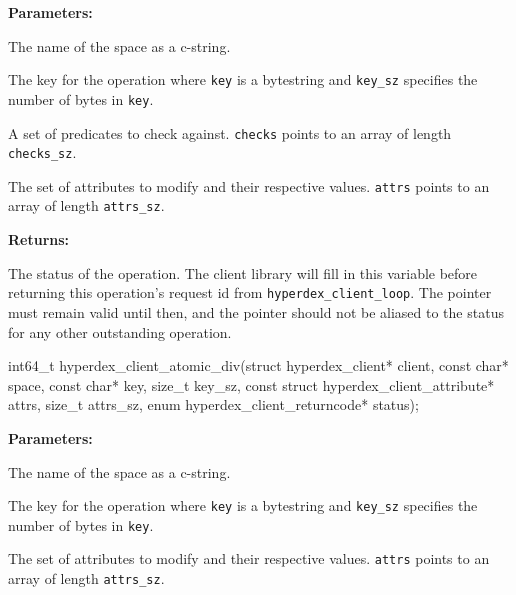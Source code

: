 \noindent\textbf{Parameters:}
\begin{description}[labelindent=\widthof{{\texttt{checks}, \texttt{checks\_sz}}},leftmargin=*,noitemsep,nolistsep,align=right]
\item[\texttt{space}] The name of the space as a c-string.
\item[\texttt{key}, \texttt{key\_sz}] The key for the operation where \texttt{key} is a bytestring and \texttt{key\_sz} specifies the number of bytes in \texttt{key}.
\item[\texttt{checks}, \texttt{checks\_sz}] A set of predicates to check against.  \texttt{checks} points to an array of length \texttt{checks\_sz}.
\item[\texttt{attrs}, \texttt{attrs\_sz}] The set of attributes to modify and their respective values.  \texttt{attrs} points to an array of length \texttt{attrs\_sz}.
\end{description}

\noindent\textbf{Returns:}
\begin{description}[labelindent=\widthof{{\texttt{status}}},leftmargin=*,noitemsep,nolistsep,align=right]
\item[\texttt{status}] The status of the operation.  The client library will fill in this variable before returning this operation's request id from \texttt{hyperdex\_client\_loop}.  The pointer must remain valid until then, and the pointer should not be aliased to the status for any other outstanding operation.
\end{description}

\funcsep
{}
\begin{ccode}
int64_t hyperdex_client_atomic_div(struct hyperdex_client* client,
                const char* space,
                const char* key, size_t key_sz,
                const struct hyperdex_client_attribute* attrs, size_t attrs_sz,
                enum hyperdex_client_returncode* status);
\end{ccode}
\funcdesc 

\noindent\textbf{Parameters:}
\begin{description}[labelindent=\widthof{{\texttt{attrs}, \texttt{attrs\_sz}}},leftmargin=*,noitemsep,nolistsep,align=right]
\item[\texttt{space}] The name of the space as a c-string.
\item[\texttt{key}, \texttt{key\_sz}] The key for the operation where \texttt{key} is a bytestring and \texttt{key\_sz} specifies the number of bytes in \texttt{key}.
\item[\texttt{attrs}, \texttt{attrs\_sz}] The set of attributes to modify and their respective values.  \texttt{attrs} points to an array of length \texttt{attrs\_sz}.
\end{description}

